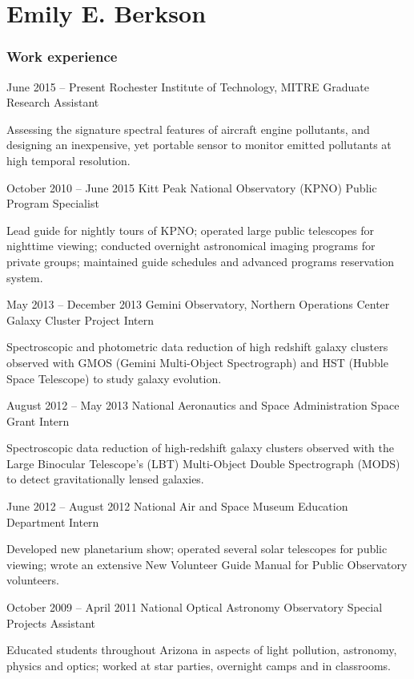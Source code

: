 \documentclass{tccv}
\begin{document}
\part{Emily E. Berkson}

\section{Work experience}

\begin{eventlist}

\item{June 2015 -- Present}
     {Rochester Institute of Technology, MITRE}
     {Graduate Research Assistant}

Assessing the signature spectral features of aircraft engine pollutants, and designing an inexpensive, yet portable sensor to monitor emitted pollutants at high temporal resolution. 

\item{October 2010 -- June 2015}
     {Kitt Peak National Observatory (KPNO)}
     {Public Program Specialist}

Lead guide for nightly tours of KPNO; operated large public telescopes for nighttime viewing; conducted overnight astronomical imaging programs for private groups; maintained guide schedules and advanced programs reservation system.

\item{May 2013 -- December 2013}
     {Gemini Observatory, Northern Operations Center}
     {Galaxy Cluster Project Intern}

Spectroscopic and photometric data reduction of high redshift galaxy clusters observed with GMOS (Gemini Multi-Object Spectrograph) and HST (Hubble Space Telescope) to study galaxy evolution.

\item{August 2012 -- May 2013}
     {National Aeronautics and Space Administration}
     {Space Grant Intern}

Spectroscopic data reduction of high-redshift galaxy clusters observed with the Large Binocular Telescope's (LBT) Multi-Object Double Spectrograph (MODS) to detect gravitationally lensed galaxies.

\item{June 2012 -- August 2012}
     {National Air and Space Museum}
     {Education Department Intern}

Developed new planetarium show; operated several solar telescopes for public viewing; wrote an extensive New Volunteer Guide Manual for Public Observatory volunteers.

\item{October 2009 -- April 2011}
     {National Optical Astronomy Observatory}
     {Special Projects Assistant}

Educated students throughout Arizona in aspects of light pollution, astronomy, physics and optics; worked at star parties, overnight camps and in classrooms.

\end{eventlist}
\end{document}
